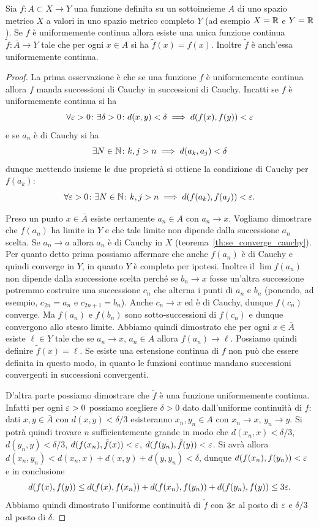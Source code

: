 \begin{theorem}
\mymark{**}
\label{th:estensione_uniformemente_continua}%
Sia $f\colon A \subset X \to Y$ una funzione definita su un sottoinsieme $A$
di uno spazio metrico $X$ a valori in uno spazio metrico completo $Y$
(ad esempio $X=\mathbb R$ e $Y=\mathbb R$). Se $f$ è uniformemente continua allora
esiste una unica funzione continua $\tilde f \colon \bar A \to Y$
tale che per ogni $x\in A$ si ha $\tilde f(x) = f(x)$.
Inoltre $\tilde f$ è anch'essa uniformemente continua.
\end{theorem}
%
\begin{proof}
La prima osservazione è
che se una funzione $f$ è uniformemente continua allora $f$
manda successioni di Cauchy in successioni di Cauchy.
Incatti se $f$ è uniformemente continua si ha
\[
 \forall \varepsilon>0\colon \exists \delta>0 \colon d(x,y)<\delta \implies d(f(x),f(y))<\varepsilon
\]
e se $a_n$ è di Cauchy si ha
\[
 \exists N\in\mathbb N \colon k,j>n \implies d(a_k,a_j)< \delta
\]
dunque mettendo insieme le due proprietà
si ottiene la condizione
di Cauchy per $f(a_k)$:
\[
\forall \varepsilon>0\colon \exists N\in \mathbb N\colon k,j>n \implies d(f(a_k),f(a_j))< \varepsilon.
\]

Preso un punto $x \in \bar A$ esiste certamente $a_n \in A$ con $a_n\to x$.
Vogliamo dimostrare che $f(a_n)$ ha limite in $Y$ e che tale limite non
dipende dalla successione $a_n$ scelta. Se $a_n \to a$ allora $a_n$ è di Cauchy in $X$
(teorema~\ref{th:se_converge_cauchy}).
Per quanto detto prima possiamo affermare che anche $f(a_n)$ è di Cauchy
e quindi converge in $Y$, in quanto $Y$ è completo per ipotesi.
Inoltre il $\lim f(a_n)$ non dipende dalla successione scelta perché
se $b_n\to x$ fosse un'altra successione potremmo costruire una successione
$c_n$ che alterna i punti di $a_n$ e $b_n$ (ponendo, ad esempio, $c_{2n} = a_n$ e
$c_{2n+1} = b_n$). Anche $c_n \to x$ ed è di Cauchy, dunque $f(c_n)$ converge.
Ma $f(a_n)$ e $f(b_n)$ sono sotto-successioni di $f(c_n)$ e dunque convergono
allo stesso limite.
Abbiamo quindi dimostrato che per ogni $x\in \bar A$ esiste $\ell \in Y$
tale che se $a_n\to x$, $a_n\in A$ allora $f(a_n) \to \ell$. Possiamo
quindi definire $\tilde f(x)=\ell$. Se esiste una estensione continua di
$f$ non può che essere definita in questo modo, in quanto le funzioni continue
mandano successioni convergenti in successioni convergenti.

D'altra parte possiamo dimostrare che $\tilde f$ è una funzione uniformemente continua.
Infatti per ogni $\varepsilon>0$ possiamo scegliere $\delta>0$ dato dall'uniforme
continuità di $f$: dati $x,y\in \bar A$ con $d(x,y)<\delta/3$ esisteranno
$x_n,y_n \in A$ con $x_n\to x$, $y_n\to y$. Si potrà quindi trovare $n$
sufficientemente grande in modo che
$d(x_n,x)<\delta/3$, $d(y_n,y)<\delta/3$,
$d(f(x_n),\tilde f(x)) < \varepsilon$, $d(f(y_n),\tilde f(y)) < \varepsilon$.
Si avrà allora
$d(x_n,y_n)< d(x_n,x)+d(x,y)+d(y,y_n) < \delta$, dunque $d(f(x_n),f(y_n))<\varepsilon$
e in conclusione
\[
d(f(x),f(y))
\le d(f(x),f(x_n)) + d(f(x_n),f(y_n)) + d(f(y_n),f(y))
\le 3\varepsilon.
\]
Abbiamo quindi dimostrato l'uniforme continuità di $\tilde f$ con $3\varepsilon$ al posto
di $\varepsilon$ e $\delta/3$
al posto di $\delta$.
\end{proof}

